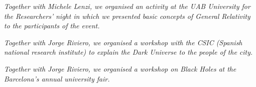 \resumeSubHeadingListStart
{}
\begin{indentedtext}
\textit{\large Together with Michele Lenzi, we organised an activity at the UAB University for the Researchers' night in which we presented basic concepts of General Relativity to the participants of the event.}
\end{indentedtext}
\resumeSubHeadingListEnd

\resumeSubHeadingListStart
{}
\begin{indentedtext}
\textit{\large Together with Jorge Riviero, we organised a workshop with the CSIC (Spanish national research institute) to explain the Dark Universe to the people of the city.}
\end{indentedtext}
\resumeSubHeadingListEnd

\resumeSubHeadingListStart
{}
\begin{indentedtext}
\textit{\large Together with Jorge Riviero, we organised a workshop on Black Holes at the Barcelona's annual university fair.}
\end{indentedtext}
\resumeSubHeadingListEnd

